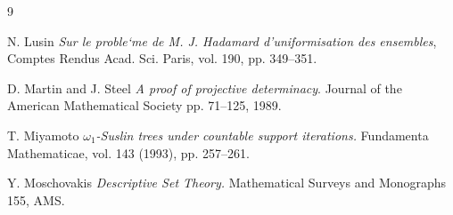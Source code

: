 \documentclass[a4paper,11pt]{article}
\begin{document}
\begin{thebibliography}{9}
 

N. Lusin \textit{Sur le proble`me de M. J. Hadamard d’uniformisation des ensembles}, Comptes Rendus Acad. Sci. Paris, vol. 190, pp. 349–351.

D. Martin and J. Steel \textit{A proof of projective determinacy}. Journal of the American  Mathematical  Society pp. 71–125, 1989.

 T. Miyamoto {\em $\omega_1$-Suslin trees under countable support iterations.} Fundamenta Mathematicae,
vol. 143 (1993), pp. 257–261.


Y. Moschovakis \textit{Descriptive Set Theory.} Mathematical Surveys and Monographs 155, AMS.







\end{thebibliography}
\end{document}
